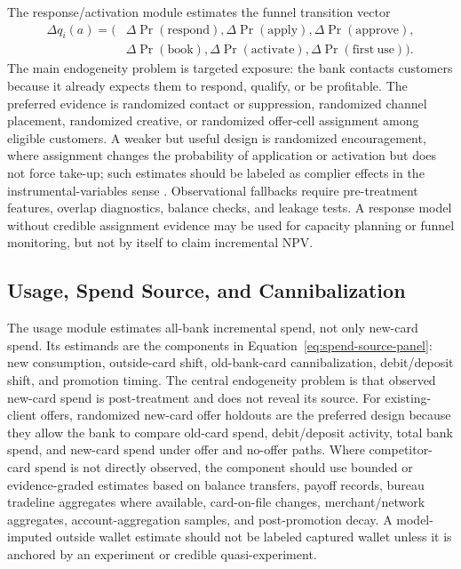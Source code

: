 \documentclass[11pt]{article}
\newcommand{\1}{\mathbf{1}}
\begin{document}
The response/activation module estimates the funnel transition vector
\begin{align}
  \Delta q_i(a)
  =
  \big(&
    \Delta\Pr(\mathrm{respond}),
    \Delta\Pr(\mathrm{apply}),
    \Delta\Pr(\mathrm{approve}), \nonumber\\
  &
    \Delta\Pr(\mathrm{book}),
    \Delta\Pr(\mathrm{activate}),
    \Delta\Pr(\mathrm{first\ use})
  \big).
  \label{eq:funnel-transition-vector}
\end{align}
The main endogeneity problem is targeted exposure: the bank contacts customers
because it already expects them to respond, qualify, or be profitable. The
preferred evidence is randomized contact or suppression, randomized channel
placement, randomized creative, or randomized offer-cell assignment among
eligible customers. A weaker but useful design is randomized encouragement,
where assignment changes the probability of application or activation but does
not force take-up; such estimates should be labeled as complier effects in the
instrumental-variables sense \citep{angristimbensrubin1996iv}. Observational
fallbacks require pre-treatment features, overlap diagnostics, balance checks,
and leakage tests. A response model without credible assignment evidence may
be used for capacity planning or funnel monitoring, but not by itself to claim
incremental NPV.

\subsection*{Usage, Spend Source, and Cannibalization}

The usage module estimates all-bank incremental spend, not only new-card
spend. Its estimands are the components in
Equation~\eqref{eq:spend-source-panel}: new consumption, outside-card shift,
old-bank-card cannibalization, debit/deposit shift, and promotion timing. The
central endogeneity problem is that observed new-card spend is post-treatment
and does not reveal its source. For existing-client offers, randomized
new-card offer holdouts are the preferred design because they allow the bank
to compare old-card spend, debit/deposit activity, total bank spend, and
new-card spend under offer and no-offer paths. Where competitor-card spend is
not directly observed, the component should use bounded or evidence-graded
estimates based on balance transfers, payoff records, bureau tradeline
aggregates where available, card-on-file changes, merchant/network aggregates,
account-aggregation samples, and post-promotion decay. A model-imputed outside
wallet estimate should not be labeled captured wallet unless it is anchored by
an experiment or credible quasi-experiment.
\end{document}
